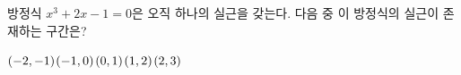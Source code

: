방정식 $x^3+2x-1=0$은 오직 하나의 실근을 갖는다. 다음 중 이 방정식의 실근이 존재하는 구간은?
\begin{choices32}{$(-2{,}\mkern3mu\mathopen{}-1)$}{$(-1{,}\mkern3mu\mathopen{}0)$}{$(0{,}\mkern3mu\mathopen{}1)$}{$(1{,}\mkern3mu\mathopen{}2)$}{$(2{,}\mkern3mu\mathopen{}3)$}\end{choices32}
